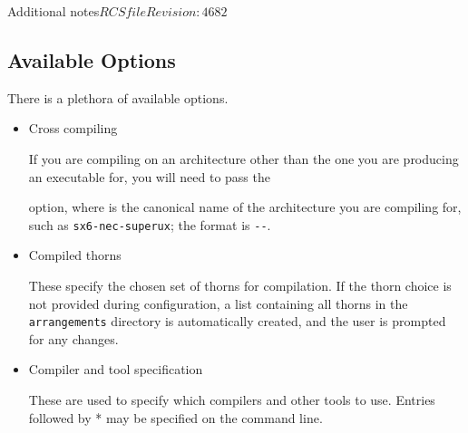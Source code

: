 \begin{cactuspart}{Additional notes}{$RCSfile$}{$Revision: 4682 $}
\subsection{Available Options}
\label{subsec:Compilation-Available_Options}

There is a plethora of available options.

\begin{itemize}

\item {Cross compiling}

If you are compiling on an architecture other than the one you are
producing an executable for, you will need to pass the

\begin{Lentry}
\item [\texttt{HOST\_MACHINE=\var{x-x-x}}]
\end{Lentry}
option, where \texttt{} is the canonical name of the architecture
you are compiling for, such as \texttt{sx6-nec-superux};  the format is
\texttt{--}.

\item {Compiled thorns}

These specify the chosen set of thorns for compilation. If the thorn choice is not provided
during configuration, a list containing all thorns in the
\texttt{arrangements} directory
is automatically created, and the user is prompted for any changes.


\item {Compiler and tool specification}

These are used to specify which compilers and other tools to use. Entries followed
by * may be specified on the command line.


\end{itemize}
\end{cactuspart}

